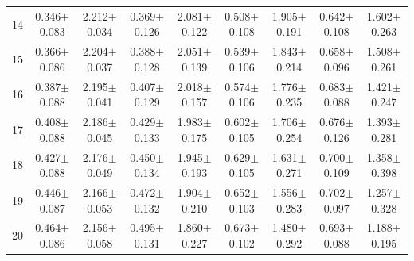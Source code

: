 \begin{table}[H]
{\begin{tabular}{c cc cc cc cc}
14 & 0.346$\pm$0.083 & 2.212$\pm$0.034 & 0.369$\pm$0.126 & 2.081$\pm$0.122 & 0.508$\pm$0.108 & 1.905$\pm$0.191 & 0.642$\pm$0.108 & 1.602$\pm$0.263 \\
15 & 0.366$\pm$0.086 & 2.204$\pm$0.037 & 0.388$\pm$0.128 & 2.051$\pm$0.139 & 0.539$\pm$0.106 & 1.843$\pm$0.214 & 0.658$\pm$0.096 & 1.508$\pm$0.261 \\
16 & 0.387$\pm$0.088 & 2.195$\pm$0.041 & 0.407$\pm$0.129 & 2.018$\pm$0.157 & 0.574$\pm$0.106 & 1.776$\pm$0.235 & 0.683$\pm$0.088 & 1.421$\pm$0.247 \\
17 & 0.408$\pm$0.088 & 2.186$\pm$0.045 & 0.429$\pm$0.133 & 1.983$\pm$0.175 & 0.602$\pm$0.105 & 1.706$\pm$0.254 & 0.676$\pm$0.126 & 1.393$\pm$0.281 \\
18 & 0.427$\pm$0.088 & 2.176$\pm$0.049 & 0.450$\pm$0.134 & 1.945$\pm$0.193 & 0.629$\pm$0.105 & 1.631$\pm$0.271 & 0.700$\pm$0.109 & 1.358$\pm$0.398 \\
19 & 0.446$\pm$0.087 & 2.166$\pm$0.053 & 0.472$\pm$0.132 & 1.904$\pm$0.210 & 0.652$\pm$0.103 & 1.556$\pm$0.283 & 0.702$\pm$0.097 & 1.257$\pm$0.328 \\
20 & 0.464$\pm$0.086 & 2.156$\pm$0.058 & 0.495$\pm$0.131 & 1.860$\pm$0.227 & 0.673$\pm$0.102 & 1.480$\pm$0.292 & 0.693$\pm$0.088 & 1.188$\pm$0.195 \\

\bottomrule

\end{tabular}
}
\end{table}

